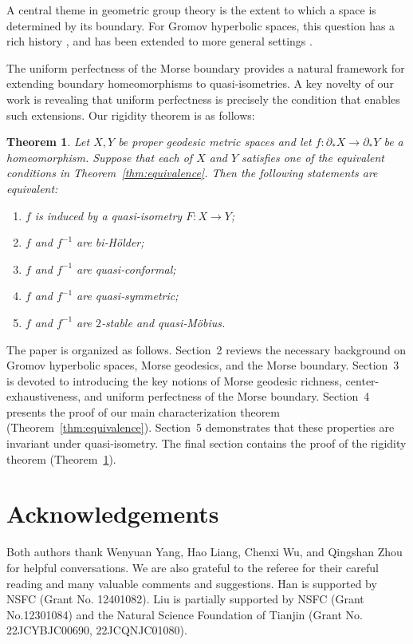\documentclass[a4paper,11pt,oneside]{article}
\newtheorem{Theorem}{Theorem}[section]
\begin{document}
A central theme in geometric group theory is the extent to which a space is determined by its boundary. For Gromov hyperbolic spaces, this question has a rich history \cite{Paulin96, Bourdon95, BonkSchramm00}, and has been extended to more general settings \cite{CharneyCordesMurray19, MousleyRussell19, Liu22}.

The uniform perfectness of the Morse boundary provides a natural framework for extending boundary homeomorphisms to quasi‑isometries. A key novelty of our work is revealing that uniform perfectness is precisely the condition that enables such extensions. Our rigidity theorem is as follows:

\begin{Theorem}\label{homeo}
Let $X, Y$ be proper geodesic metric spaces and let $f: \partial_*X\to \partial_*Y$ be a homeomorphism.
Suppose that each of $X$ and $Y$ satisfies one of the equivalent conditions in Theorem~\ref{thm:equivalence}. Then the following statements are equivalent:
\begin{enumerate}
\item $f$ is induced by a quasi-isometry $F:X\to Y$;
\item $f$ and $f^{-1}$ are bi‑Hölder;
\item $f$ and $f^{-1}$ are quasi‑conformal;
\item $f$ and $f^{-1}$ are quasi‑symmetric;
\item $f$ and $f^{-1}$ are $2$‑stable and quasi‑Möbius.
\end{enumerate}
\end{Theorem}

 The paper is organized as follows. Section~2 reviews the necessary background on Gromov hyperbolic spaces, Morse geodesics, and the Morse boundary. Section~3 is devoted to introducing the key notions of Morse geodesic richness, center-exhaustiveness, and uniform perfectness of the Morse boundary. Section~4 presents the proof of our main characterization theorem (Theorem~\ref{thm:equivalence}). Section~5 demonstrates that these properties are invariant under quasi‑isometry. The final section contains the proof of the rigidity theorem (Theorem~\ref{homeo}).

\vspace{1em}

   \section*{Acknowledgements}
   Both authors thank Wenyuan Yang, Hao Liang, Chenxi Wu, and Qingshan Zhou for helpful conversations. We are also grateful to the referee for their careful reading and many valuable comments and suggestions. Han is supported by NSFC (Grant No. 12401082). Liu is partially supported by NSFC (Grant No.12301084) and the Natural Science Foundation of Tianjin (Grant No. 22JCYBJC00690, 22JCQNJC01080).
\end{document}
